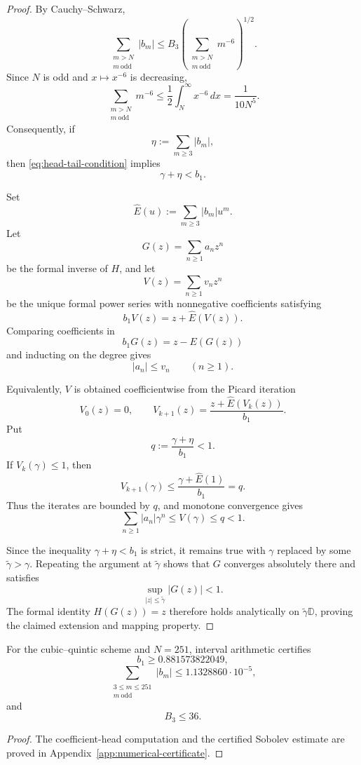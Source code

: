 \begin{proof}
By Cauchy--Schwarz,
\[
\sum_{\substack{m>N\\m\ \mathrm{odd}}}|b_m|
\le
B_3
\left(
\sum_{\substack{m>N\\m\ \mathrm{odd}}}m^{-6}
\right)^{1/2}.
\]
Since \(N\) is odd and \(x\mapsto x^{-6}\) is decreasing,
\[
\sum_{\substack{m>N\\m\ \mathrm{odd}}}m^{-6}
\le
\frac12\int_N^\infty x^{-6}\,dx
=
\frac{1}{10N^5}.
\]
Consequently, if
\[
\eta:=\sum_{m\ge3}|b_m|,
\]
then \eqref{eq:head-tail-condition} implies
\[
\gamma+\eta<b_1.
\]

Set
\[
\widehat E(u):=\sum_{m\ge3}|b_m|u^m.
\]
Let
\[
G(z)=\sum_{n\ge1}a_nz^n
\]
be the formal inverse of \(H\), and let
\[
V(z)=\sum_{n\ge1}v_nz^n
\]
be the unique formal power series with nonnegative coefficients
satisfying
\[
b_1V(z)=z+\widehat E(V(z)).
\]
Comparing coefficients in
\[
b_1G(z)=z-E(G(z))
\]
and inducting on the degree gives
\[
|a_n|\le v_n
\qquad (n\ge1).
\]

Equivalently, \(V\) is obtained coefficientwise from the Picard
iteration
\[
V_0(z)=0,
\qquad
V_{k+1}(z)
=
\frac{z+\widehat E(V_k(z))}{b_1}.
\]
Put
\[
q:=\frac{\gamma+\eta}{b_1}<1.
\]
If \(V_k(\gamma)\le1\), then
\[
V_{k+1}(\gamma)
\le
\frac{\gamma+\widehat E(1)}{b_1}
=
q.
\]
Thus the iterates are bounded by \(q\), and monotone convergence gives
\[
\sum_{n\ge1}|a_n|\gamma^n
\le
V(\gamma)
\le q
<1.
\]

Since the inequality \(\gamma+\eta<b_1\) is strict, it remains true
with \(\gamma\) replaced by some
\(\widetilde\gamma>\gamma\). Repeating the argument at
\(\widetilde\gamma\) shows that \(G\) converges absolutely there and
satisfies
\[
\sup_{|z|\le\widetilde\gamma}|G(z)|<1.
\]
The formal identity \(H(G(z))=z\) therefore holds analytically on
\(\widetilde\gamma\mathbb D\), proving the claimed extension and
mapping property.
\end{proof}

\begin{proposition}
\label{prop:certified-data}
For the cubic--quintic scheme and \(N=251\), interval arithmetic
certifies
\[
b_1\ge 0.881573822049,
\]
\[
\sum_{\substack{3\le m\le251\\m\ \mathrm{odd}}}|b_m|
\le 1.1328860\cdot10^{-5},
\]
and
\[
B_3\le36.
\]
\end{proposition}

\begin{proof}
The coefficient-head computation and the certified Sobolev estimate
are proved in Appendix~\ref{app:numerical-certificate}.
\end{proof}

